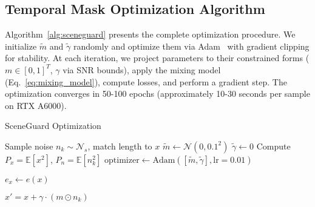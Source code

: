 \subsection{Temporal Mask Optimization Algorithm}

Algorithm~\ref{alg:sceneguard} presents the complete optimization procedure. We initialize $\tilde{m}$ and $\tilde{\gamma}$ randomly and optimize them via Adam~\citep{adam} with gradient clipping for stability. At each iteration, we project parameters to their constrained forms ($m \in [0,1]^T$, $\gamma$ via SNR bounds), apply the mixing model (Eq.~\eqref{eq:mixing_model}), compute losses, and perform a gradient step. The optimization converges in 50-100 epochs (approximately 10-30 seconds per sample on RTX A6000).

\begin{algorithm}[t]
\caption{SceneGuard Optimization}
\label{alg:sceneguard}

Sample noise $n_k \sim \mathcal{N}_s$, match length to $x$\;
$\tilde{m} \leftarrow \mathcal{N}(0, 0.1^2)$ 
$\tilde{\gamma} \leftarrow 0$ 
Compute $P_x = \mathbb{E}[x^2]$, $P_n = \mathbb{E}[n_k^2]$\;
$\text{optimizer} \leftarrow \text{Adam}([\tilde{m}, \tilde{\gamma}], \text{lr}=0.01)$\;

$e_x \leftarrow e(x)$ 


\Return $x' = x + \gamma \cdot (m \odot n_k)$\;
\end{algorithm}

